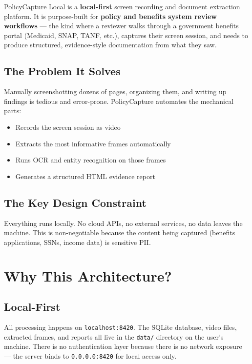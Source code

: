 \documentclass[12pt, a4paper]{article}
\newcommand{\codeinline}[1]{\texttt{\small\colorbox{codebg}{#1}}}
\begin{document}
PolicyCapture Local is a \textbf{local-first} screen recording and document extraction platform. It is purpose-built for \textbf{policy and benefits system review workflows} --- the kind where a reviewer walks through a government benefits portal (Medicaid, SNAP, TANF, etc.), captures their screen session, and needs to produce structured, evidence-style documentation from what they saw.

\subsection{The Problem It Solves}

Manually screenshotting dozens of pages, organizing them, and writing up findings is tedious and error-prone. PolicyCapture automates the mechanical parts:

\begin{itemize}
    \item Records the screen session as video
    \item Extracts the most informative frames automatically
    \item Runs OCR and entity recognition on those frames
    \item Generates a structured HTML evidence report
\end{itemize}

\subsection{The Key Design Constraint}

Everything runs locally. No cloud APIs, no external services, no data leaves the machine. This is non-negotiable because the content being captured (benefits applications, SSNs, income data) is sensitive PII.

\section{Why This Architecture?}

\subsection{Local-First}

All processing happens on \codeinline{localhost:8420}. The SQLite database, video files, extracted frames, and reports all live in the \codeinline{data/} directory on the user's machine. There is no authentication layer because there is no network exposure --- the server binds to \codeinline{0.0.0.0:8420} for local access only.
\end{document}
